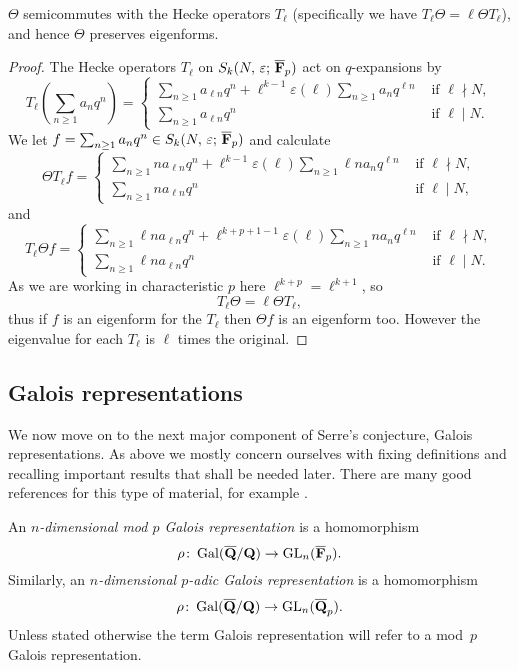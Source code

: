 \documentclass[a4paper,12pt]{article}
\begin{document}
\begin{prop}\label{prop:thetaeigen}
$\Theta$ semicommutes with the Hecke operators $T_{\ell}$ (specifically we have $T_{\ell}\Theta = \ell\Theta T_{\ell}$), and hence $\Theta$ preserves eigenforms.
\end{prop}
\begin{proof}
The Hecke operators $T_{\ell}$ on $S_k(N,\,\varepsilon;\,\overline{\mathbf{F}}_p)$ act on $q$-expansions by
\[
T_{\ell}\left(\sum_{n\ge 1} a_nq^n\right) = \begin{cases}
\sum_{n\ge 1} a_{\ell n}q^n + \ell^{k-1}\varepsilon(\ell)\sum_{n\ge 1} a_{n}q^{\ell n} &\text{ if }\ell \nmid N,\\
\sum_{n\ge 1} a_{\ell n}q^n &\text{ if }\ell \mid N.
\end{cases}
\]
We let $f = \sum_{n\ge 1} a_nq^n\in S_k(N,\,\varepsilon;\,\overline{\mathbf{F}}_p)$ and calculate
\[
\Theta T_{\ell} f = \begin{cases}
\sum_{n\ge 1} na_{\ell n}q^n + \ell^{k-1}\varepsilon(\ell)\sum_{n\ge 1} \ell n a_{n}q^{\ell n} &\text{ if }\ell \nmid N,\\
\sum_{n\ge 1} na_{\ell n}q^n &\text{ if }\ell \mid N,
\end{cases}
\]
and
\[
T_{\ell}\Theta f = \begin{cases}
\sum_{n\ge 1} \ell n a_{\ell n}q^n + \ell^{k+p+1-1} \varepsilon(\ell)\sum_{n\ge 1} n a_{n}q^{\ell n} &\text{ if }\ell \nmid N,\\
\sum_{n\ge 1} \ell n a_{\ell n}q^n &\text{ if }\ell \mid N.
\end{cases}
\]
As we are working in characteristic $p$ here $\ell^{k+p} = \ell^{k+1}$, so
\[
 T_{\ell} \Theta = \ell \Theta T_{\ell},
\]
thus if $f$ is an eigenform for the $T_\ell$ then $\Theta f$ is an eigenform too.
However the eigenvalue for each $T_\ell$ is $\ell$ times the original.
\end{proof}


\subsection{Galois representations}\label{sec:gals}
We now move on to the next major component of Serre's conjecture, Galois representations.
As above we mostly concern ourselves with fixing definitions and recalling important results that shall be needed later.
There are many good references for this type of material, for example \cite{DDT,WieseGal}.

\begin{defn}
An \emph{$n$-dimensional mod $p$ Galois representation} is a homomorphism
\[
\rho\colon \operatorname{Gal}(\overline{\mathbf{Q}}/\mathbf{Q}) \to \operatorname{GL}_n(\overline{\mathbf{F}}_p).
\]
Similarly, an \emph{$n$-dimensional $p$-adic Galois representation} is a homomorphism
\[
\rho\colon \operatorname{Gal}(\overline{\mathbf{Q}}/\mathbf{Q}) \to \operatorname{GL}_n(\overline{\mathbf{Q}}_p).
\]
Unless stated otherwise the term Galois representation will refer to a mod~$p$ Galois representation.
\end{defn}
\end{document}
